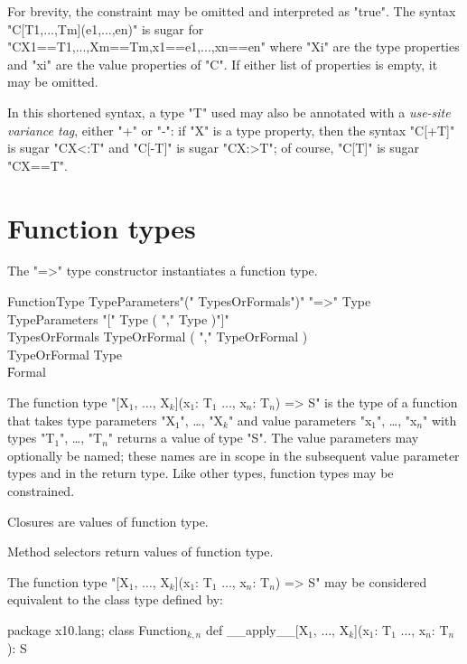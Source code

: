 For brevity, the constraint may be omitted and
interpreted as \xcd"true".
The syntax 
\xcd"C[T1,...,Tm](e1,...,en)" is sugar for
\xcd"C{X1==T1,...,Xm==Tm,x1==e1,...,xn==en}"
where \xcd"Xi" are the type properties and \xcd"xi" are the
value properties of \xcd"C".  
If either list of properties is empty, it may be omitted.

In this shortened syntax, a type \xcd"T" used may also be annotated
with
a \emph{use-site variance tag}, either \xcd"+" or \xcd"-":
if \xcd"X" is a type property, then
the syntax \xcd"C[+T]" is sugar \xcd"C{X<:T}" and
\xcd"C[-T]" is sugar \xcd"C{X:>T}"; of course,
\xcd"C[T]" is sugar \xcd"C{X==T}".

\section{Function types}

The \xcd"=>" type constructor instantiates a function type.

\begin{grammar}
FunctionType \: TypeParameters\opt \xcd"(" TypesOrFormals\opt \xcd")" \xcd"=>" Type  \\
TypeParameters \: \xcd"[" Type ( \xcd"," Type )\star \xcd"]" \\
TypesOrFormals \: TypeOrFormal ( \xcd"," TypeOrFormal )\star \\
TypeOrFormal   \: Type \\
               \| Formal \\
\end{grammar}

The function type
\xcdmath"[X$_1$, $\dots$, X$_k$](x$_1$: T$_1$ $\dots$, x$_n$: T$_n$) => S"
is the type of a function that takes type parameters
\xcdmath"X$_1$", \dots, \xcdmath"X$_k$"
and value parameters
\xcdmath"x$_1$", \dots, \xcdmath"x$_n$"
with types
\xcdmath"T$_1$", \dots, \xcdmath"T$_n$"
returns a value of type \xcd"S".  The value parameters may
optionally be named; these names are in scope in the subsequent
value parameter types and in the return type.
Like other types, function types may be constrained.

Closures are values of function type.

Method selectors return values of function type.

The function type
\xcdmath"[X$_1$, $\dots$, X$_k$](x$_1$: T$_1$ $\dots$, x$_n$: T$_n$) => S"
may be considered equivalent to the class type defined by:
\begin{xtenmath}
package x10.lang;
class Function$_{k,n}$ {
    def __apply__[X$_1$, $\dots$, X$_k$](x$_1$: T$_1$ $\dots$, x$_n$: T$_n$): S
}
\end{xtenmath}

